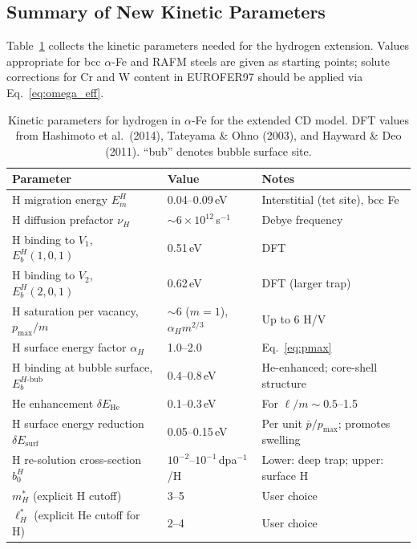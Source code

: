 \subsection{Summary of New Kinetic Parameters}
\label{sec:H_params}

Table~\ref{tab:H_params} collects the kinetic parameters needed for the
hydrogen extension.  Values appropriate for bcc $\alpha$-Fe and RAFM
steels are given as starting points; solute corrections for Cr and W
content in EUROFER97 should be applied via Eq.~\eqref{eq:omega_eff}.

\begin{table}[htbp]
\centering
\caption{Kinetic parameters for hydrogen in $\alpha$-Fe for the extended
CD model.  DFT values from Hashimoto et al.\ (2014), Tateyama \& Ohno
(2003), and Hayward \& Deo (2011).  ``bub'' denotes bubble surface site.}
\label{tab:H_params}
\renewcommand{\arraystretch}{1.3}
\begin{tabular}{@{}p{5.5cm}ll@{}}
\toprule
\textbf{Parameter} & \textbf{Value} & \textbf{Notes} \\
\midrule
H migration energy $E_m^H$ & 0.04--0.09\,eV
  & Interstitial (tet site), bcc Fe \\
H diffusion prefactor $\nu_H$ & $\sim$$6\times10^{12}$\,s$^{-1}$
  & Debye frequency \\
H binding to $V_1$, $E_b^H(1,0,1)$ & 0.51\,eV & DFT \\
H binding to $V_2$, $E_b^H(2,0,1)$ & 0.62\,eV & DFT (larger trap) \\
H saturation per vacancy, $p_{\max}/m$ & $\sim$6 ($m=1$), $\alpha_H m^{2/3}$ & Up to 6 H/V \\
H surface energy factor $\alpha_H$ & 1.0--2.0 & Eq.~\eqref{eq:pmax} \\
H binding at bubble surface, $E_b^{H\text{-bub}}$ & 0.4--0.8\,eV
  & He-enhanced; core-shell structure \\
He enhancement $\delta E_{\mathrm{He}}$ & 0.1--0.3\,eV
  & For $\ell/m \sim 0.5$--1.5 \\
H surface energy reduction $\delta E_{\mathrm{surf}}$ & 0.05--0.15\,eV
  & Per unit $\bar{p}/p_{\max}$; promotes swelling \\
H re-solution cross-section $b_0^H$ & $10^{-2}$--$10^{-1}$\,dpa$^{-1}$/H
  & Lower: deep trap; upper: surface H \\
$m_H^*$ (explicit H cutoff) & 3--5 & User choice \\
$\ell_H^*$ (explicit He cutoff for H) & 2--4 & User choice \\
\bottomrule
\end{tabular}
\end{table}


